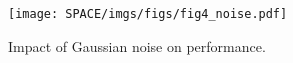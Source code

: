 \begin{figure}[htb]
    \centering
    \texttt{[image: SPACE/imgs/figs/fig4\_noise.pdf]}
    \vspace{-0.01cm}
    \caption{Impact of Gaussian noise on performance. 
    }
    \label{fig:noise}
    \vspace{-0.01cm}
\end{figure}

